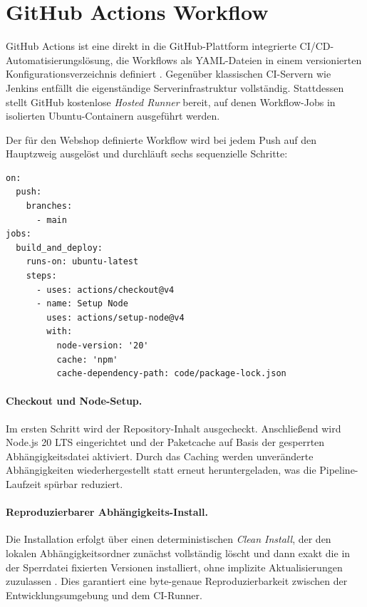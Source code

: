 \section{GitHub Actions Workflow}
\label{sec:github-actions}

GitHub Actions ist eine direkt in die GitHub-Plattform integrierte CI/CD-Automatisierungslösung, die Workflows als YAML-Dateien in einem versionierten Konfigurationsverzeichnis definiert \cite{makani2022}. Gegenüber klassischen CI-Servern wie Jenkins entfällt die eigenständige Serverinfrastruktur vollständig. Stattdessen stellt GitHub kostenlose \textit{Hosted Runner} bereit, auf denen Workflow-Jobs in isolierten Ubuntu-Containern ausgeführt werden.

Der für den Webshop definierte Workflow wird bei jedem Push auf den Hauptzweig ausgelöst und durchläuft sechs sequenzielle Schritte:

\begin{lstlisting}[language={}, caption=GitHub Actions Workflow -- Trigger und Job-Konfiguration, label=lst:workflow-trigger]
on:
  push:
    branches:
      - main
jobs:
  build_and_deploy:
    runs-on: ubuntu-latest
    steps:
      - uses: actions/checkout@v4
      - name: Setup Node
        uses: actions/setup-node@v4
        with:
          node-version: '20'
          cache: 'npm'
          cache-dependency-path: code/package-lock.json
\end{lstlisting}

\paragraph{Checkout und Node-Setup.}
Im ersten Schritt wird der Repository-Inhalt ausgecheckt. Anschließend wird Node.js 20 LTS eingerichtet und der Paketcache auf Basis der gesperrten Abhängigkeitsdatei aktiviert. Durch das Caching werden unveränderte Abhängigkeiten wiederhergestellt statt erneut heruntergeladen, was die Pipeline-Laufzeit spürbar reduziert.

\paragraph{Reproduzierbarer Abhängigkeits-Install.}
Die Installation erfolgt über einen deterministischen \textit{Clean Install}, der den lokalen Abhängigkeitsordner zunächst vollständig löscht und dann exakt die in der Sperrdatei fixierten Versionen installiert, ohne implizite Aktualisierungen zuzulassen \cite{jani2023}. Dies garantiert eine byte-genaue Reproduzierbarkeit zwischen der Entwicklungsumgebung und dem CI-Runner.


